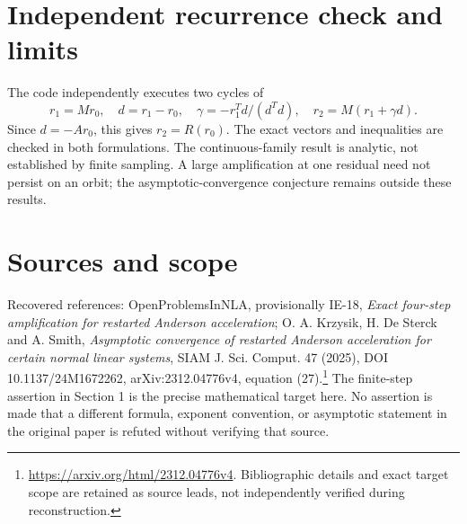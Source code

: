 \documentclass[11pt]{article}
\begin{document}
\section{Independent recurrence check and limits}
The code independently executes two cycles of
\[
r_1=Mr_0,\quad d=r_1-r_0,\quad\gamma=-r_1^Td/(d^Td),\quad r_2=M(r_1+\gamma d).
\]
Since $d=-Ar_0$, this gives $r_2=R(r_0)$. The exact vectors and inequalities are checked in both formulations. The continuous-family result is analytic, not established by finite sampling. A large amplification at one residual need not persist on an orbit; the asymptotic-convergence conjecture remains outside these results.
\section{Sources and scope}
Recovered references: OpenProblemsInNLA, provisionally IE-18, \emph{Exact four-step amplification for restarted Anderson acceleration}; O. A. Krzysik, H. De Sterck and A. Smith, \emph{Asymptotic convergence of restarted Anderson acceleration for certain normal linear systems}, SIAM J. Sci. Comput. 47 (2025), DOI 10.1137/24M1672262, arXiv:2312.04776v4, equation (27).\footnote{\url{https://arxiv.org/html/2312.04776v4}. Bibliographic details and exact target scope are retained as source leads, not independently verified during reconstruction.}
The finite-step assertion in Section 1 is the precise mathematical target here. No assertion is made that a different formula, exponent convention, or asymptotic statement in the original paper is refuted without verifying that source.
\end{document}
